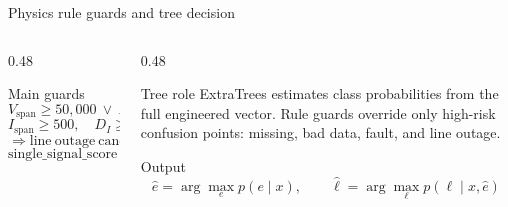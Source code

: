 ﻿\documentclass[10pt,aspectratio=169]{beamer}
\begin{document}
\begin{frame}{Physics rule guards and tree decision}
\scriptsize
\begin{columns}[T,totalwidth=\textwidth]
\begin{column}{0.48\textwidth}
\begin{alertblock}{Main guards}
\[
V_{\mathrm{span}}\ge50{,}000\ \lor\ D_V\ge500{,}000
\Rightarrow \mathrm{fault\ candidate}
\]
\[
I_{\mathrm{span}}\ge500,\quad D_I\ge3{,}000,\quad V_{\mathrm{span}}\le50{,}000
\]
\[
\Rightarrow \mathrm{line\ outage\ candidate}
\]
\[
\mathrm{single\_signal\_score}\ge200{,}000,\quad
\mathrm{ratio}\ge3
\Rightarrow \mathrm{bad\ data}
\]
\end{alertblock}
\end{column}
\begin{column}{0.48\textwidth}
\begin{block}{Tree role}
ExtraTrees estimates class probabilities from the full engineered vector. Rule guards override only high-risk confusion points: missing, bad data, fault, and line outage.
\end{block}
\begin{exampleblock}{Output}
\[
\hat{e}=\arg\max_e p(e\mid x),\qquad
\hat{\ell}=\arg\max_\ell p(\ell\mid x,\hat{e})
\]
\end{exampleblock}
\end{column}
\end{columns}
\end{frame}
\end{document}
